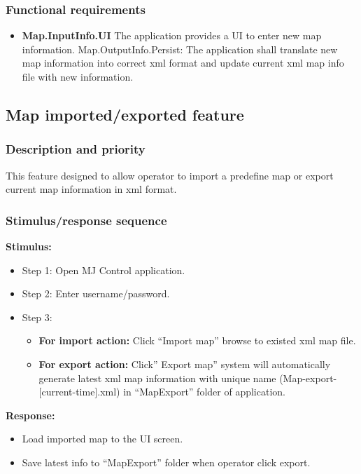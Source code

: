 \documentclass[10pt,a4paper,titlepage]{article}
\begin{document}
	\subsubsection{Functional requirements}
	\begin{itemize}
		\item \textbf{Map.InputInfo.UI} \space The application provides a UI to enter new map information.
		Map.OutputInfo.Persist: The application shall translate new map information into correct xml format and update current xml map info file with new information.
	\end{itemize}
	
	
	\subsection{Map imported/exported feature}
	\subsubsection{Description and priority}
	\text This feature designed to allow operator to import a predefine map or export current map information in xml format.
	\subsubsection{Stimulus/response sequence}
		\textbf{Stimulus:}
	\begin{itemize}
		\item Step 1: Open MJ Control application.
		\item Step 2: Enter username/password.
		\item {Step 3:}
		\begin{itemize}	
			\item \textbf{For import action:} Click “Import map” browse to existed xml map file.
			\item \textbf{For export action:} Click” Export map” system will automatically generate latest xml map information with unique name (Map-export-[current-time].xml) in “MapExport” folder of application.
		\end{itemize}
		
	\end{itemize}
	\textbf{Response:}
	\begin{itemize}
	\item Load imported map to the UI screen.
	\item Save latest info to “MapExport” folder when operator click export.
	\end{itemize}
\end{document}
